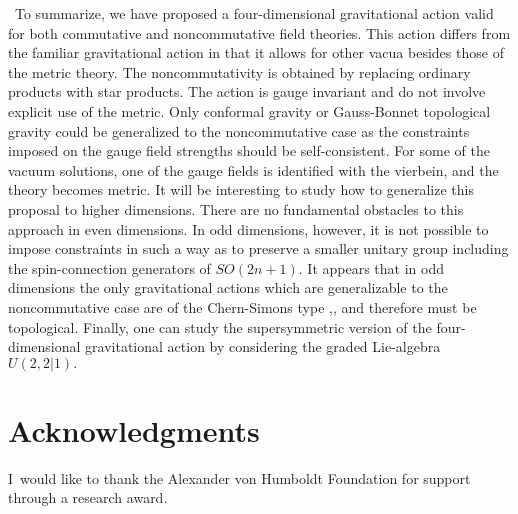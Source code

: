 \documentclass[a4paper,a4paper]{article}
\begin{document}
\ To summarize, we have proposed a four-dimensional gravitational action valid
for both commutative and noncommutative field theories. This action differs
from the familiar gravitational action in that it allows for other vacua
besides those of the metric theory. The noncommutativity is obtained by
replacing ordinary products with star products. The action is gauge invariant
and do not involve explicit use of the metric. Only conformal gravity or
Gauss-Bonnet topological gravity could be generalized to the noncommutative
case as the constraints imposed on the gauge field strengths should be
self-consistent. For some of the vacuum solutions, one of the gauge fields is
identified with the vierbein, and the theory becomes metric. It will be
interesting to study how to generalize this proposal to higher dimensions.
There are no fundamental obstacles to this approach in even dimensions. In odd
dimensions, however, it is not possible to impose constraints in such a way as
to preserve a smaller unitary group including the spin-connection generators
of $SO(2n+1).$ It appears that in odd dimensions the only gravitational
actions which are generalizable to the noncommutative case are of the
Chern-Simons type \cite{CF},\cite{poly}, and therefore must be topological.
Finally, one can study the supersymmetric version of the four-dimensional
gravitational action by considering the graded Lie-algebra $U(2,2|1).$

\section{Acknowledgments}

I\ would like to thank the Alexander von Humboldt Foundation for support
through a research award.
\end{document}
